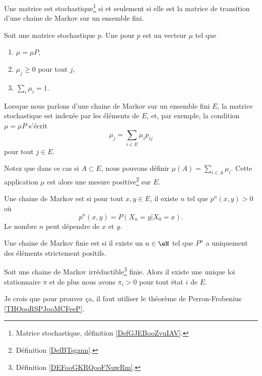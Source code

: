 \begin{lemma}		\label{LEMooYKFZooUEOWbi}
	Une matrice est stochastique\footnote{Matrice stochastique, définition \ref{DefGJEBooZvuIAV}.} si et seulement si elle est la matrice de transition d'une chaine de Markov sur un ensemble fini.
\end{lemma}

\begin{definition}
	Soit une matrice stochastique \( p\). Une  pour \( p\) est un vecteur \( \mu\) tel que
	\begin{enumerate}
		\item
		      \( \mu=\mu P\),
		\item
		      \( \mu_j\geq 0\) pour tout \( j\),
		\item
		      \( \sum_i\mu_i=1\).
	\end{enumerate}
\end{definition}

Lorsque nous parlons d'une chaine de Markov sur un ensemble fini \( E\), la matrice stochastique est indexée par les éléments de \( E\), et, par exemple, la condition \( \mu=\mu P\) s'écrit
\begin{equation}
	\mu_j=\sum_{i\in E}\mu_ip_{ij}
\end{equation}
pour tout \( j\in E\).

Notez que dans ce cas si \( A\subset E\), nous pouvons définir \( \mu(A)=\sum_{i\in A}\mu_i\). Cette application \( \mu\) est alors une mesure positive\footnote{Définition \ref{DefBTsgznn}.} sur \( E\).

\begin{definition}      \label{DEFooGKRQooFNuwRm}
	Une chaine de Markov est  si pour tout \( x,y\in E\), il existe \( n\) tel que \( p^n(x,y)>0\) où
	\begin{equation}
		p^n(x,y)=P(X_n=y|X_0=x).
	\end{equation}
	Le nombre \( n\) peut dépendre de \( x\) et \( y\).

	Une chaine de Markov finie est  si il existe un \( n\in \eN\) tel que \( P^n\) a uniquement des éléments strictement positifs.
\end{definition}

\begin{proposition}     \label{PropUMPpOHW}
	Soit une chaine de Markov irréductible\footnote{Définition \ref{DEFooGKRQooFNuwRm}.} finie. Alors il existe une unique loi stationnaire \( \pi\) et de plus nous avons \( \pi_i>0\) pour tout état \( i\) de \( E\).
\end{proposition}
Je crois que pour prouver ça, il faut utiliser le théorème de Perron-Frobenius \ref{THOooRSPJooMCFeeP}.

